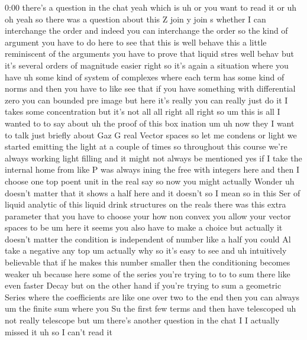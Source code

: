 \begin{unfinished}{0:00}
there's  a  question  in  the  chat  yeah
which  is  uh  or  you  want  to  read  it  or  uh
oh  yeah  so  there  was  a  question  about
this  Z  join  y  join  s  whether  I  can
interchange  the  order  and  indeed  you  can
interchange  the
order
so  the  kind  of  argument  you  have  to  do
here  to  see  that  this  is  well  behave
this  a  little  reminiscent  of  the
arguments  you  have  to  prove  that  liquid
stres  well  behav  but  it's  several  orders
of  magnitude  easier
right
so  it's  again  a  situation  where  you  have
uh  some  kind  of  system  of  complexes
where  each  term  has  some  kind  of  norms
and  then  you  have  to  like  see  that  if
you  have  something  with  differential
zero  you  can  bounded  pre  image  but  here
it's  really  you  can  really  just  do
it
I  takes  some  concentration  but  it's  not
all
all  right  all  right  so  um  this  is  all  I
wanted  to  to  say  about  uh  the  proof  of
this  box
ination
um  uh  now  they  I  want  to  talk  just
briefly  about  Gaz  G  real  Vector
spaces
so  let
me  condens  or
light  we  started  emitting  the  light  at  a
couple  of  times  so  throughout  this
course  we're  always  working  light
filling  and  it  might  not  always  be
mentioned
yes  if  I  take
the  internal
home  from  like  P  was  always  ining  the
free  with
integers
here
and  then  I  choose  one  top  poent  unit  in
the  real
say  so  now  you  might  actually  Wonder  uh
doesn't  matter  that  it  shows  a  half  here
and  it  doesn't  so  I  mean  so  in  this  Ser
of  liquid  analytic  of  this  liquid  drink
structures  on  the  reals  there  was  this
extra  parameter  that  you  have  to  choose
your  how  non  convex  you  allow  your
vector  spaces  to  be  um  here  it  seems  you
also  have  to  make  a  choice  but  actually
it  doesn't  matter  the  condition  is
independent
of  number  like  a
half  you  could  Al  take  a
negative  any
top
um  actually
why  so  it's  easy  to  see  and  uh
intuitively  believable  that  if  he  makes
this  number  smaller  then  the
conditioning  becomes
weaker  uh  because  here  some  of  the
series  you're  trying  to  to  to  sum  there
like  even  faster  Decay  but  on  the  other
hand  if  you're  trying  to  sum  a  geometric
Series  where  the  coefficients  are  like
one  over  two  to  the  end  then  you  can
always  um  the  finite  sum  where  you  Su
the  first  few  terms  and
then  have  telescoped  uh  not  really
telescope  but
um
there's  another  question  in  the  chat  I  I
actually  missed  it  uh  so  I  can't  read  it

\end{unfinished}
